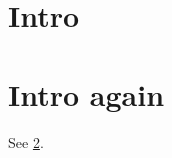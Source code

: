 \documentclass{article}
\begin{document}
\section{Intro}\label{sec:intro}
\section{Intro again}\label{sec:intro}
See \ref{sec:intro}.
\end{document}
